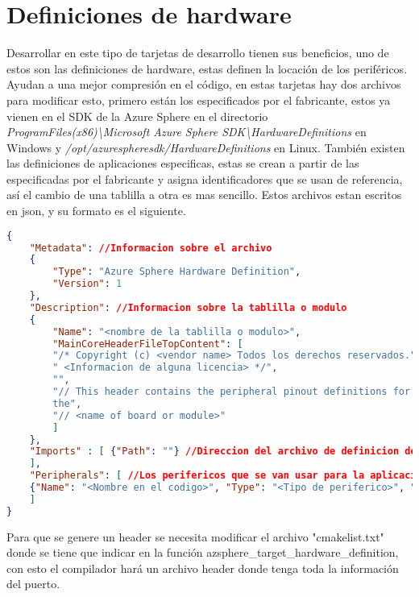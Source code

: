 \section{Definiciones de hardware}
Desarrollar en este tipo de tarjetas de desarrollo tienen sus beneficios, uno de estos son las definiciones de hardware, estas definen la locación de los periféricos. Ayudan a una mejor compresión en el código, en estas tarjetas hay dos archivos para modificar esto, primero están los especificados por el fabricante, estos ya vienen en el SDK de la Azure Sphere en el directorio \textit{ProgramFiles(x86)\textbackslash Microsoft Azure Sphere SDK\textbackslash HardwareDefinitions} en Windows y \textit{/opt/azurespheresdk/HardwareDefinitions} en Linux. También existen las definiciones de aplicaciones especificas, estas se crean a partir de las especificadas por el fabricante y asigna identificadores que se usan de referencia, así el cambio de una tablilla a otra es mas sencillo.
Estos archivos estan escritos en json, y su formato es el siguiente.
\begin{lstlisting}[language = json, firstnumber=1]
{
	"Metadata": //Informacion sobre el archivo
	{
		"Type": "Azure Sphere Hardware Definition",
		"Version": 1
	},
	"Description": //Informacion sobre la tablilla o modulo
	{
		"Name": "<nombre de la tablilla o modulo>",
		"MainCoreHeaderFileTopContent": [
		"/* Copyright (c) <vendor name> Todos los derechos reservados.",
		" <Informacion de alguna licencia> */",
		"",
		"// This header contains the peripheral pinout definitions for
		the",
		"// <name of board or module>"
		]
	},
	"Imports" : [ {"Path": ""} //Direccion del archivo de definicion de hardware para definir sobre ella
	],
	"Peripherals": [ //Los perifericos que se van usar para la aplicacion
	{"Name": "<Nombre en el codigo>", "Type": "<Tipo de periferico>", "Mapping": "<El nombre del periferico en el archivo importado>", "Comment": "<Informacion a destacar>"},
	]
}
\end{lstlisting}

Para que se genere un header se necesita modificar el archivo "cmakelist.txt" donde se tiene que indicar en la función azsphere\_target\_hardware\_definition, con esto el compilador hará un archivo header donde tenga toda la información del puerto.


